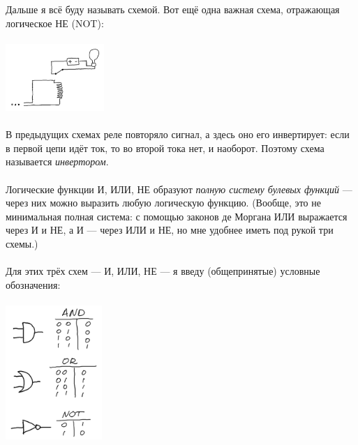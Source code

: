 \documentclass[11pt]{book}
\begin{document}
\\ \\
Дальше я всё буду называть схемой. Вот ещё одна важная схема, отражающая логическое НЕ (NOT):
\\ \\
\includegraphics[height=1in]{pic/17.png}
\\ \\
В предыдущих схемах реле повторяло сигнал, а здесь оно его инвертирует: если в первой цепи идёт ток, то во второй тока нет, и наоборот.
Поэтому схема называется \emph{инвертором}.
\\ \\
Логические функции И, ИЛИ, НЕ образуют \emph{полную систему булевых функций} --- через них можно выразить любую логическую функцию.
(Вообще, это не минимальная полная система: с помощью законов де Моргана ИЛИ выражается через И и НЕ, а И --- через ИЛИ и НЕ,
но мне удобнее иметь под рукой три схемы.)
\\ \\
Для этих трёх схем --- И, ИЛИ, НЕ --- я введу (общепринятые) условные обозначения:
\\ \\
\includegraphics[height=2in]{pic/logic_legend.png}
\end{document}
